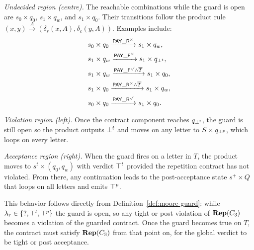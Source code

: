 \begin{example}
\smallskip
\emph{Undecided region (centre).}
The reachable combinations while the guard is open are
\(s_0\times q_0\),
\(s_1\times q_w\),
and \(s_1\times q_0\).
Their transitions follow the product rule \((x,y)\xrightarrow{A}(\delta_r(x,A),\delta_c(y,A))\).
Examples include:
\[
\begin{aligned}
&s_0\times q_0 \xrightarrow{\mathsf{PAY\_R}^\times} s_1\times q_w,\\
&s_1\times q_w \xrightarrow{\mathsf{PAY\_F}^\times} s_1\times q_{\bot^t},\\
&s_1\times q_w \xrightarrow{\mathsf{PAY\_F}^\surd \wedge \overline{T}} s_1\times q_0,\\
&s_1\times q_0 \xrightarrow{\mathsf{PAY\_R}^\times \wedge \overline{T}} s_1\times q_w,\\
&s_0\times q_0 \xrightarrow{\mathsf{PAY\_R}^\surd} s_1\times q_0.
\end{aligned}
\]

\smallskip
\emph{Violation region (left).}
Once the contract component reaches \(q_{\bot^t}\),
the guard is still open so the product outputs \(\bot^t\) and moves on any
letter to \(S\times q_{\bot^p}\), which loops on every letter.

\smallskip
\emph{Acceptance region (right).}
When the guard fires on a letter in \(T\), the product moves to
\(s^t\times(q_0,q_w)\) with verdict \(\top^t\) provided the repetition contract has
not violated. From there, any continuation leads to the post-acceptance
state \(s^{+}\times Q\) that loops on all letters and emits \(\top^p\).

\medskip
\noindent
This behavior follows directly from Definition~\ref{def:moore-guard}:
while \(\lambda_r\in\{\mathsf{?},\top^t,\top^p\}\) the guard is open, so any tight or
post violation of \(\mathbf{Rep}(C_3)\) becomes a violation of the guarded contract.
Once the guard becomes true on \(T\), the contract must satisfy \(\mathbf{Rep}(C_3)\)
from that point on, for the global verdict to be tight or post acceptance.


\end{example}


